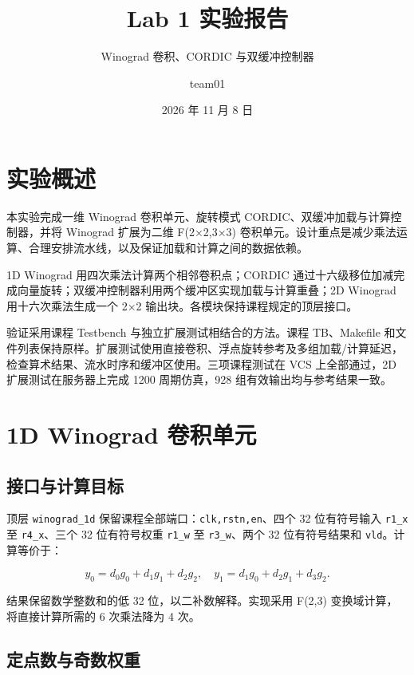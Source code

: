 \documentclass[
  10pt,
  a4paper,
]{article}
\title{Lab 1 实验报告}
\subtitle{Winograd 卷积、CORDIC 与双缓冲控制器}
\author{team01}
\date{2026 年 11 月 8 日}
\begin{document}
\maketitle

\section{实验概述}\label{ux5b9eux9a8cux6982ux8ff0}

本实验完成一维 Winograd 卷积单元、旋转模式
CORDIC、双缓冲加载与计算控制器，并将 Winograd 扩展为二维 F(2×2,3×3)
卷积单元。设计重点是减少乘法运算、合理安排流水线，以及保证加载和计算之间的数据依赖。

1D Winograd 用四次乘法计算两个相邻卷积点；CORDIC
通过十六级移位加减完成向量旋转；双缓冲控制器利用两个缓冲区实现加载与计算重叠；2D
Winograd 用十六次乘法生成一个 2×2 输出块。各模块保持课程规定的顶层接口。

验证采用课程 Testbench 与独立扩展测试相结合的方法。课程 TB、Makefile
和文件列表保持原样。扩展测试使用直接卷积、浮点旋转参考及多组加载/计算延迟，检查算术结果、流水时序和缓冲区使用。三项课程测试在
VCS 上全部通过，2D 扩展测试在服务器上完成 1200 周期仿真，928
组有效输出均与参考结果一致。

\section{1D Winograd
卷积单元}\label{d-winograd-ux5377ux79efux5355ux5143}

\subsection{接口与计算目标}\label{ux63a5ux53e3ux4e0eux8ba1ux7b97ux76eeux6807}

顶层 \texttt{winograd\_1d} 保留课程全部端口：\texttt{clk,rstn,en}、四个
32 位有符号输入 \texttt{r1\_x} 至 \texttt{r4\_x}、三个 32 位有符号权重
\texttt{r1\_w} 至 \texttt{r3\_w}、两个 32 位有符号结果和
\texttt{vld}。计算等价于：

\[y_0=d_0g_0+d_1g_1+d_2g_2,\quad y_1=d_1g_0+d_2g_1+d_3g_2.\]

结果保留数学整数和的低 32 位，以二补数解释。实现采用 F(2,3)
变换域计算，将直接计算所需的 6 次乘法降为 4 次。

\subsection{定点数与奇数权重}\label{ux5b9aux70b9ux6570ux4e0eux5947ux6570ux6743ux91cd}
\end{document}
